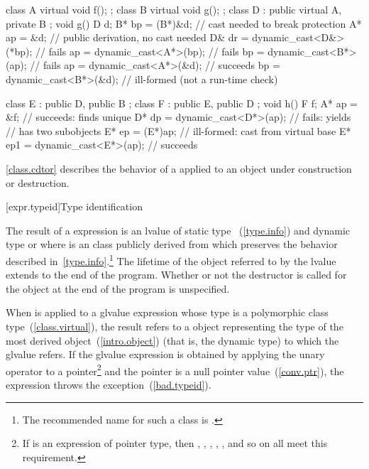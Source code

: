 \begin{codeblock}
class A { virtual void f(); };
class B { virtual void g(); };
class D : public virtual A, private B { };
void g() {
  D   d;
  B*  bp = (B*)&d;                  // cast needed to break protection
  A*  ap = &d;                      // public derivation, no cast needed
  D&  dr = dynamic_cast<D&>(*bp);   // fails
  ap = dynamic_cast<A*>(bp);        // fails
  bp = dynamic_cast<B*>(ap);        // fails
  ap = dynamic_cast<A*>(&d);        // succeeds
  bp = dynamic_cast<B*>(&d);        // ill-formed (not a run-time check)
}

class E : public D, public B { };
class F : public E, public D { };
void h() {
  F   f;
  A*  ap  = &f;                     // succeeds: finds unique 
  D*  dp  = dynamic_cast<D*>(ap);   // fails: yields 
                                    //  has two  subobjects
  E*  ep  = (E*)ap;                 // ill-formed: cast from virtual base
  E*  ep1 = dynamic_cast<E*>(ap);   // succeeds
}
\end{codeblock}
\exitexample 
\enternote
\ref{class.cdtor} describes the behavior of a 
applied to an object under construction or destruction.
\exitnote 

[expr.typeid]{Type identification}

\pnum
{}%
%
The result of a  expression is an lvalue of static type
%
%
 ~(\ref{type.info}) and dynamic type 
 or   where  is an
 class publicly derived from
 which preserves the behavior described
in~\ref{type.info}.\footnote{The recommended name for such a class is
.}
The lifetime of the object referred to by the lvalue extends to the end
of the program. Whether or not the destructor is called for the
 object at the end of the program is unspecified.

\pnum
When  is applied to a glvalue expression whose type is a
polymorphic class type~(\ref{class.virtual}), the result refers to a
 object representing the type of the most derived
object~(\ref{intro.object}) (that is, the dynamic type) to which the
glvalue refers. If the glvalue expression is obtained by applying the
unary \tcode{*} operator to a pointer\footnote{If  is an expression of
pointer type, then ,
, , , , and so on
all meet this requirement.}
and the pointer is a null pointer value~(\ref{conv.ptr}), the
 expression throws the
%
%
exception~(\ref{bad.typeid}).

